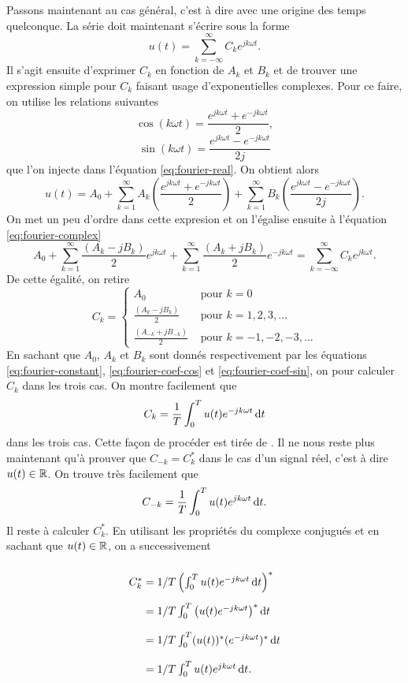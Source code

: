 Passons maintenant au cas général, c'est à
dire avec une origine des temps quelconque.
La série doit maintenant s'écrire sous la
forme
\begin{equation}
	u(t) = \sum_{k=-\infty}^\infty C_k e^{jk\omega t}.
	\label{eq:fourier-complex}
\end{equation}
Il s'agit ensuite d'exprimer $C_k$ en fonction
de $A_k$ et $B_k$ et de trouver une expression
simple pour $C_k$ faisant usage d'exponentielles
complexes. Pour ce faire, on utilise les relations
suivantes
\[ \cos(k\omega t) = \frac{e^{jk\omega t}+e^{-jk\omega t}}{2},\]
\[ \sin(k\omega t) = \frac{e^{jk\omega t}-e^{-jk\omega t}}{2j}\]
que l'on injecte dans l'équation \ref{eq:fourier-real}. On obtient
alors
\[ u(t) = A_0 + \sum_{k=1}^{\infty} A_k\left(\frac{e^{jk\omega t}+e^{-jk\omega t}}{2}\right)
	+ \sum_{k=1}^{\infty} B_k\left(\frac{e^{jk\omega t}-e^{-jk\omega t}}{2j}\right). \]
On met un peu d'ordre dans cette expresion et on l'égalise 
ensuite à l'équation \ref{eq:fourier-complex}
\[ A_0 + \sum_{k=1}^{\infty} \frac{(A_k-jB_k)}{2}e^{jk\omega t}
	+ \sum_{k=1}^{\infty} \frac{(A_k+jB_k)}{2}e^{-jk\omega t} = 
	\sum_{k=-\infty}^\infty C_k e^{jk\omega t}.\]
De cette égalité, on retire
\[ C_k =
	\left\{
		\begin{array}{cl}
			A_0 & \text{ pour } k = 0 \\
			\frac{(A_k-jB_k)}{2} & \text{ pour } k = 1,2,3,\dots \\
			\frac{(A_{-k}+jB_{-k})}{2} & \text{ pour } k = -1,-2,-3,\dots
		\end{array}
	\right.
\]
En sachant que $A_0$, $A_k$ et $B_k$ sont
donnés respectivement par les équations
\ref{eq:fourier-constant}, \ref{eq:fourier-coef-cos}
et \ref{eq:fourier-coef-sin}, on pour calculer
$C_k$ dans les trois cas. On montre facilement que
\[ C_k = \frac{1}{T} \int_0^T u(t)e^{-jk\omega t}\operatorname{d}\! t\]
dans les trois cas. Cette façon de procéder est tirée de 
\cite{complex-fourier-series}.
Il ne nous reste plus maintenant qu'à prouver
que $C_{-k} = C_k^*$ dans le cas d'un signal réel,
c'est à dire $u(t) \in \mathbb{R}$. On trouve très facilement que
\begin{equation}
	C_{-k} = \frac{1}{T} \int_0^T u(t)e^{jk\omega t}\operatorname{d}\! t.
	\label{eq:c-minus}
\end{equation}
Il reste à calculer $C^*_k$. En utilisant les propriétés
du complexe conjugués et en sachant que $u(t) \in \mathbb{R}$,
on a successivement

\[\arraycolsep=1.4pt\def\arraystretch{2.2}
	\begin{array}{cl}
		C_k^* &= 1/T \left(\int_0^T u(t)e^{-jk\omega t} \dif t\right)^* \\ 
					&= 1/T \int_0^T \left(u(t)e^{-jk\omega t}\right)^* \dif t \\
					&= 1/T \int_0^T (u(t))^*(e^{-jk\omega t})^* \dif t \\
					&= 1/T \int_0^T u(t)e^{jk\omega t} \dif t.
	\end{array}
\]

